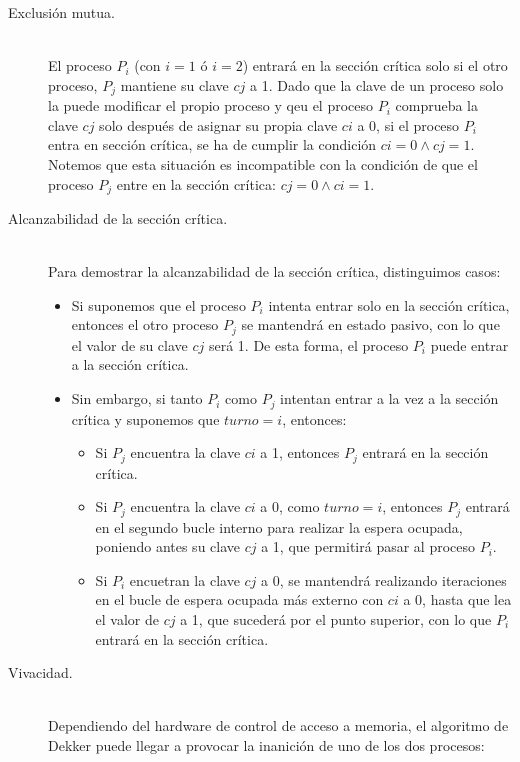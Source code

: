 \begin{description}
    \item [Exclusión mutua.]~\\
    El proceso $P_i$ (con $i = 1$ ó $i=2$) entrará en la sección crítica solo si el otro proceso, $P_j$ mantiene su clave $cj$ a 1. Dado que la clave de un proceso solo la puede modificar el propio proceso y qeu el proceso $P_i$ comprueba la clave $cj$ solo después de asignar su propia clave $ci$ a 0, si el proceso $P_i$ entra en sección crítica, se ha de cumplir la condición $ci = 0 \land cj = 1$. Notemos que esta situación es incompatible con la condición de que el proceso $P_j$ entre en la sección crítica: $cj = 0 \land ci = 1$.
    \item [Alcanzabilidad de la sección crítica.]~\\
    Para demostrar la alcanzabilidad de la sección crítica, distinguimos casos:
    \begin{itemize}
        \item Si suponemos que el proceso $P_i$ intenta entrar solo en la sección crítica, entonces el otro proceso $P_j$ se mantendrá en estado pasivo, con lo que el valor de su clave $cj$ será 1. De esta forma, el proceso $P_i$ puede entrar a la sección crítica.
        \item Sin embargo, si tanto $P_i$ como $P_j$ intentan entrar a la vez a la sección crítica y suponemos que $turno = i$, entonces:
            \begin{itemize}
                \item Si $P_j$ encuentra la clave $ci$ a 1, entonces $P_j$ entrará en la sección crítica.
                \item Si $P_j$ encuentra la clave $ci$ a 0, como $turno = i$, entonces $P_j$ entrará en el segundo bucle interno para realizar la espera ocupada, poniendo antes su clave $cj$ a 1, que permitirá pasar al proceso $P_i$.
                \item Si $P_i$ encuetran la clave $cj$ a 0, se mantendrá realizando iteraciones en el bucle de espera ocupada más externo con $ci$ a 0, hasta que lea el valor de $cj$ a 1, que sucederá por el punto superior, con lo que $P_i$ entrará en la sección crítica.
            \end{itemize}
    \end{itemize}

    
    \item [Vivacidad.]~\\
    Dependiendo del hardware de control de acceso a memoria, el algoritmo de Dekker puede llegar a provocar la inanición de uno de los dos procesos:


\end{description}
